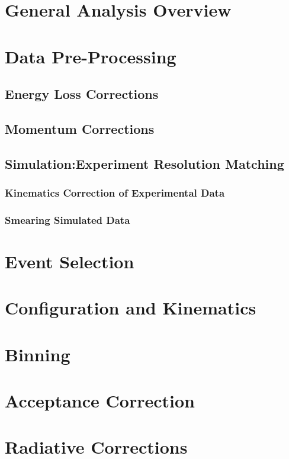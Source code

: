 \section{General Analysis Overview}

\section{Data Pre-Processing}
    \subsection{Energy Loss Corrections}
    \subsection{Momentum Corrections}
    \subsection{Simulation:Experiment Resolution Matching}
        \subsubsection{Kinematics Correction of Experimental Data}
        \subsubsection{Smearing Simulated Data}
        

\section{Event Selection}

\section{Configuration and Kinematics}

\section{Binning}

\section{Acceptance Correction}

\section{Radiative Corrections}



